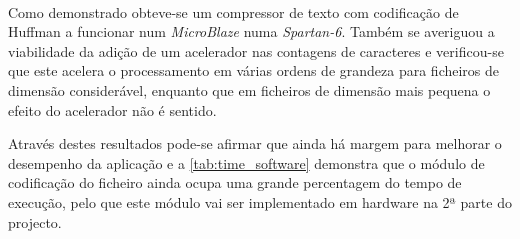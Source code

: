 \paragraph{} Como demonstrado obteve-se um compressor de texto com codificação de Huffman a funcionar num \textit{MicroBlaze} numa \textit{Spartan-6}. Também se averiguou a viabilidade da adição de um acelerador nas contagens de caracteres e verificou-se que este acelera o processamento em várias ordens de grandeza para ficheiros de dimensão considerável, enquanto que em ficheiros de dimensão mais pequena o efeito do acelerador não é sentido.

Através destes resultados pode-se afirmar que ainda há margem para melhorar o desempenho da aplicação e a \autoref{tab:time_software} demonstra que o módulo de codificação do ficheiro ainda ocupa uma grande percentagem do tempo de execução, pelo que este módulo vai ser implementado em hardware na 2ª parte do projecto.
